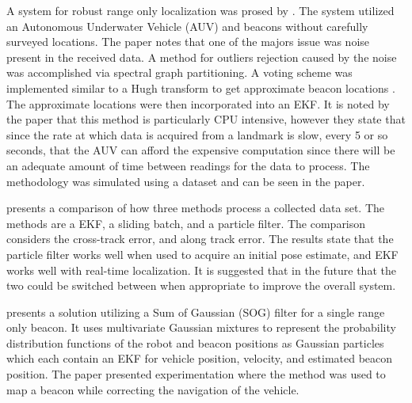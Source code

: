 \documentclass[conference]{IEEEtran}
\begin{document}
	A system for robust range only localization was prosed by \cite{Olson2006}. The system utilized an Autonomous Underwater Vehicle (AUV) and beacons without carefully surveyed locations. The paper notes that one of the majors issue was noise present in the received data. A method for outliers rejection caused by the noise was accomplished via spectral graph partitioning. A voting scheme was implemented similar to a Hugh transform to get approximate beacon locations \cite{Hough1959}. The approximate locations were then incorporated into an EKF. It is noted by the paper that this method is particularly CPU intensive, however they state that since the rate at which data is acquired from a landmark is slow, every 5 or so seconds, that the AUV can afford the expensive computation since there will be an adequate amount of time between readings for the data to process. The methodology was simulated using a dataset and can be seen in the paper.
	
	
	\cite{Kurth2003} presents a comparison of how three methods process a collected data set. The methods are a EKF, a sliding batch, and a particle filter. The comparison considers the cross-track error, and along track error. The results state that the particle filter works well when used to acquire an initial pose estimate, and EKF works well with real-time localization. It is suggested that in the future that the two could be switched between when appropriate to improve the overall system. 
	
	
	
	
	
	
	
	
	
	
	
	
	
	
	
	\cite{Vallicrosa2015} presents a solution utilizing a Sum of Gaussian (SOG) filter for a single range only beacon. It uses multivariate Gaussian mixtures to represent the probability distribution functions of the robot and beacon positions as Gaussian particles which each contain an EKF for vehicle position, velocity, and estimated beacon position. The paper presented experimentation where the method was used to map a beacon while correcting the navigation of the vehicle. 
	
\end{document}
